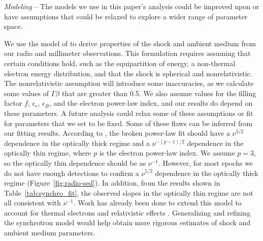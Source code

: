 \documentclass[twocolumn,twocolappendix, linenumbers, trackchanges]{aastex7}
\begin{document}
{\em Modeling} -- The models we use in this paper's analysis could be improved upon or have assumptions that could be relaxed to explore a wider range of parameter space.  

We use the model of \citet{chevalier} to derive properties of the shock and ambient medium from our radio and millimeter observations.  This formulation requires assuming that certain conditions hold, such as the equipartition of energy, a non-thermal electron energy distribution, and that the shock is spherical and nonrelativistic.  The nonrelativistic assumption will introduce some inaccuracies, as we calculate some values of $\Gamma \beta$ that are greater than 0.5.  We also assume values for the filling factor $f$, $\epsilon_e$, $\epsilon_B$, and the electron power-law index, and our results do depend on these parameters. %
A future analysis could relax some of these assumptions or fit for parameters that we set to be fixed.  Some of these flaws can be inferred from our fitting results.  According to \citet{chevalier}, the broken power-law fit should have a $\nu^{5/2}$ dependence in the optically thick regime and a $\nu^{-(p-1)/2}$ dependence in the optically thin regime, where $p$ is the electron power-law index.  We assume $p=3$, so the optically thin dependence should be as $\nu^{-1}$.  However, for most epochs we do not have enough detections to confirm a $\nu^{5/2}$ dependence in the optically thick regime (Figure~\ref{fig:radio-sed}).  In addition, from the results shown in Table~\ref{tab:synchro_fit}, the observed slopes in the optically thin regime are not all consistent with $\nu^{-1}$.  Work has already been done to extend this model to account for thermal electrons \citep{margalit2021} and relativistic effects \citep{margalit2024, ferguson2025}.  Generalizing and refining the synchrotron model would help obtain more rigorous estimates of shock and ambient medium parameters.   %
\end{document}
